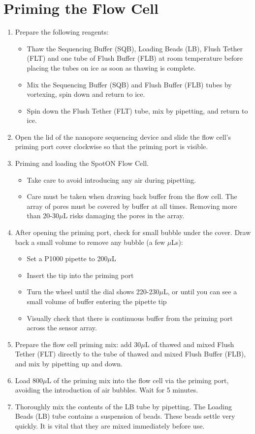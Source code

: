 \section{Priming the Flow Cell}
\begin{enumerate}
	\item Prepare the following reagents:
	\begin{itemize}
		\item Thaw the Sequencing Buffer (SQB), Loading Beads (LB), Flush Tether (FLT) and one tube of Flush Buffer (FLB) at room temperature before placing the tubes on ice as soon as thawing is complete.
		\item Mix the Sequencing Buffer (SQB) and Flush Buffer (FLB) tubes by vortexing, spin down and return to ice.
		\item Spin down the Flush Tether (FLT) tube, mix by pipetting, and return to ice.
	\end{itemize}
	\item Open the lid of the nanopore sequencing device and slide the flow cell's priming port cover clockwise so that the priming port is visible.
	\item Priming and loading the SpotON Flow Cell.
	\begin{itemize}
		\item Take care to avoid introducing any air during pipetting.
		\item Care must be taken when drawing back buffer from the flow cell. The array of pores must be covered by buffer at all times. Removing more than 20-30$\mu$L risks damaging the pores in the array.
	\end{itemize}
	\item After opening the priming port, check for small bubble under the cover. Draw back a small volume to remove any bubble (a few $\mu$Ls):
	\begin{itemize}
		\item Set a P1000 pipette to 200$\mu$L
		\item Insert the tip into the priming port
		\item Turn the wheel until the dial shows 220-230$\mu$L, or until you can see a small volume of buffer entering the pipette tip
		\item Visually check that there is continuous buffer from the priming port across the sensor array.
	\end{itemize}
	\item Prepare the flow cell priming mix: add 30$\mu$L of thawed and mixed Flush Tether (FLT) directly to the tube of thawed and mixed Flush Buffer (FLB), and mix by pipetting up and down.
	\item Load 800$\mu$L of the priming mix into the flow cell via the priming port, avoiding the introduction of air bubbles. Wait for 5 minutes.
	\item Thoroughly mix the contents of the LB tube by pipetting. The Loading Beads (LB) tube contains a suspension of beads. These beads settle very quickly. It is vital that they are mixed immediately before use.
\end{enumerate}

